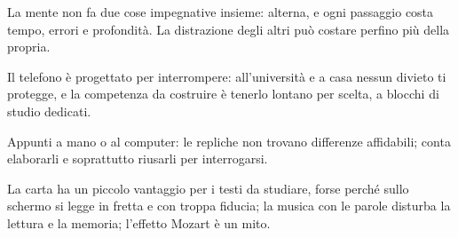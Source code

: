 \begin{sintesi}
  \item La mente non fa due cose impegnative insieme: alterna, e ogni
        passaggio costa tempo, errori e profondità. La distrazione degli
        altri può costare perfino più della propria.
  \item Il telefono è progettato per interrompere: all'università e a
        casa nessun divieto ti protegge, e la competenza da costruire è
        tenerlo lontano per scelta, a blocchi di studio dedicati.
  \item Appunti a mano o al computer: le repliche non trovano
        differenze affidabili; conta elaborarli e soprattutto riusarli
        per interrogarsi.
  \item La carta ha un piccolo vantaggio per i testi da studiare, forse
        perché sullo schermo si legge in fretta e con troppa fiducia; la
        musica con le parole disturba la lettura e la memoria; l'effetto
        Mozart è un mito.
\end{sintesi}

\finecapitolo
